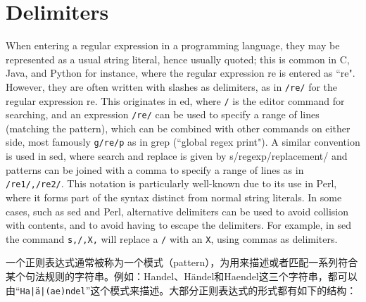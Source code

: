 \section{Delimiters}


When entering a regular expression in a programming language, they may be represented as a usual string literal, hence usually quoted; this is common in C, Java, and Python for instance, where the regular expression re is entered as ``re". However, they are often written with slashes as delimiters, as in \texttt{/re/} for the regular expression re. This originates in ed, where \texttt{/} is the editor command for searching, and an expression \texttt{/re/} can be used to specify a range of lines (matching the pattern), which can be combined with other commands on either side, most famously \texttt{g/re/p} as in grep (``global regex print"). A similar convention is used in sed, where search and replace is given by s/regexp/replacement/ and patterns can be joined with a comma to specify a range of lines as in \texttt{/re1/,/re2/}. This notation is particularly well-known due to its use in Perl, where it forms part of the syntax distinct from normal string literals. In some cases, such as sed and Perl, alternative delimiters can be used to avoid collision with contents, and to avoid having to escape the delimiters. For example, in sed the command \texttt{s,/,X,} will replace a \texttt{/} with an \texttt{X}, using commas as delimiters.



一个正则表达式通常被称为一个模式（pattern），为用来描述或者匹配一系列符合某个句法规则的字符串。例如：Handel、Händel和Haendel这三个字符串，都可以由“\texttt{Ha|ä|(ae)ndel}”这个模式来描述。大部分正则表达式的形式都有如下的结构：

